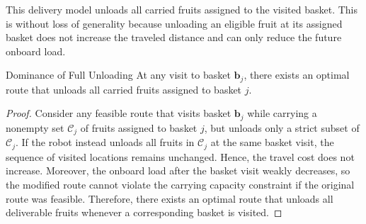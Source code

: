 This delivery model unloads all carried fruits assigned to the visited basket. This is without loss of generality because unloading an eligible fruit at its assigned basket does not increase the traveled distance and can only reduce the future onboard load.

\begin{prop}{Dominance of Full Unloading}
\label{prop:full_unloading}
At any visit to basket $\mathbf{b}_j$, there exists an optimal route that unloads all carried fruits assigned to basket $j$.
\end{prop}

\begin{proof}
Consider any feasible route that visits basket $\mathbf{b}_j$ while carrying a nonempty set $\mathcal{C}_j$ of fruits assigned to basket $j$, but unloads only a strict subset of $\mathcal{C}_j$. If the robot instead unloads all fruits in $\mathcal{C}_j$ at the same basket visit, the sequence of visited locations remains unchanged. Hence, the travel cost does not increase. Moreover, the onboard load after the basket visit weakly decreases, so the modified route cannot violate the carrying capacity constraint if the original route was feasible. Therefore, there exists an optimal route that unloads all deliverable fruits whenever a corresponding basket is visited.
\end{proof}
